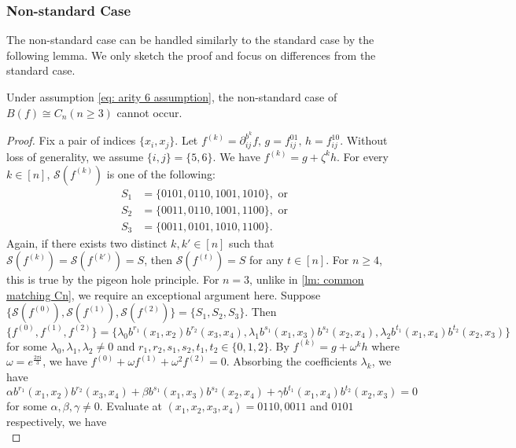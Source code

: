 \subsubsection{Non-standard Case}
The non-standard case can be handled similarly to the standard case by the following lemma.
We only sketch the proof and focus on differences from the standard case.
\begin{lemma} 
    Under assumption \eqref{eq: arity 6 assumption}, the non-standard case of $B(f)\cong C_n (n\ge 3)$ cannot occur.
\end{lemma}
\begin{proof}
    Fix a pair of indices $\{x_i,x_j\}.$
    Let $f^{(k)}=\partial_{ij}^{b^k}f,\, g=f_{ij}^{01},\, h=f_{ij}^{10}.$
    Without loss of generality, we assume $\{i,j\}=\{5,6\}.$
    We have 
    $
        f^{(k)}=g+\zeta^k h.
    $
    For every $k\in[n]$, $\mathscr{S}(f^{(k)})$ is one of the following:
    \begin{equation*}
        \begin{aligned}
        S_1&=\{0101,0110,1001,1010\}, \text{ or}\\
        S_2&=\{0011,0110,1001,1100\},\text{ or}\\
        S_3&=\{0011,0101,1010,1100\}.
        \end{aligned}
    \end{equation*}
    Again, if there exists two distinct $k,k'\in[n]$ such that $\mathscr{S}(f^{(k)})=\mathscr{S}(f^{(k')})=S$, then $\mathscr{S}(f^{(t)})=S$ for any $t\in[n]$.
    For $n\ge 4$, this is true by the pigeon hole principle.
    For $n=3$,
    unlike in \cref{lm: common matching Cn}, we require an exceptional argument here.
    Suppose $\{\mathscr{S}(f^{(0)}),\mathscr{S}(f^{(1)}),\mathscr{S}(f^{(2)})\}=\{S_1,S_2,S_3\}.$
    Then 
    \[\{f^{(0)},f^{(1)},f^{(2)}\}=\{\lambda_0b^{r_1}(x_1,x_2)b^{r_2}(x_3,x_4),\lambda_1b^{s_1}(x_1,x_3)b^{s_2}(x_2,x_4),\lambda_2b^{t_1}(x_1,x_4)b^{t_2}(x_2,x_3)\}\]
    for some $\lambda_0,\lambda_1,\lambda_2\neq 0$ and $r_1,r_2,s_1,s_2,t_1,t_2\in\{0,1,2\}.$
    By
    $
        f^{(k)}=g+\omega^k h
    $
    where $\omega=e^{\frac{2\pi \mathfrak{i}}{3}}$, we have
    $f^{(0)}+\omega f^{(1)}+\omega^2 f^{(2)}=0.$
    Absorbing the coefficients $\lambda_k$, we have
    $$
    \alpha b^{r_1}(x_1,x_2)b^{r_2}(x_3,x_4)+\beta b^{s_1}(x_1,x_3)b^{s_2}(x_2,x_4)+\gamma b^{t_1}(x_1,x_4)b^{t_2}(x_2,x_3)=0
    $$
    for some $\alpha,\beta,\gamma\neq0.$
    Evaluate at $(x_1,x_2,x_3,x_4)=0110,0011$ and $0101$ respectively, we have
    \begin{equation*}

\end{equation*}
\end{proof}
